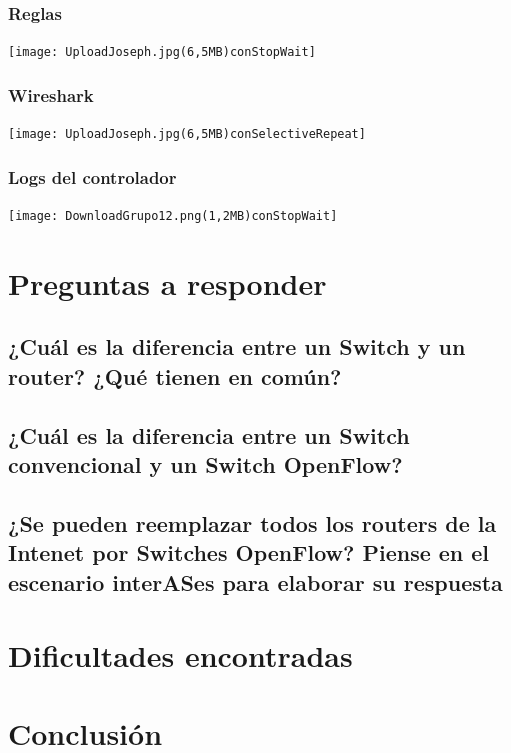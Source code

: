 \documentclass{article}
\begin{document}
\subsubsection{Reglas}
\begin{center}
\texttt{[image: UploadJoseph.jpg(6,5MB)conStopWait]}
\end{center}

\subsubsection{Wireshark}
\begin{center}
\texttt{[image: UploadJoseph.jpg(6,5MB)conSelectiveRepeat]}
\end{center}

\subsubsection{Logs del controlador}
\begin{center}
\texttt{[image: DownloadGrupo12.png(1,2MB)conStopWait]}
\end{center}


\section{\texorpdfstring{\textbf{Preguntas a responder}}{Preguntas a responder}}\label{preguntas-a-responder}

\subsection{\texorpdfstring{\textbf{¿Cuál es la diferencia entre un Switch y un router? ¿Qué tienen en común?}}{1. ¿Cuál es la diferencia entre un Switch y un router? ¿Qué tienen en común?}}\label{describa-la-arquitectura-cliente-servidor.}


\subsection{\texorpdfstring{\textbf{¿Cuál es la diferencia entre un Switch convencional y un Switch OpenFlow?}}{¿Cuál es la diferencia entre un Switch convencional y un Switch OpenFlow?}}\label{detalle-el-protocolo-de-aplicaciuxf3n-desarrollado-en-este-trabajo.}


\subsection{\texorpdfstring{\textbf{¿Se pueden reemplazar todos los routers de la Intenet por Switches OpenFlow? Piense en el escenario interASes para elaborar su respuesta}}{¿Se pueden reemplazar todos los routers de la Intenet por Switches OpenFlow? Piense en el escenario interASes para elaborar su respuesta}}\label{la-capa-de-transporte-del-stack-tcpip-ofrece-dos-protocolos-tcp-y-udp.-quuxe9-servicios-proveen-dichos-protocolos-cuuxe1les-son-sus-caracteruxedsticas-cuuxe1ndo-es-apropiado-utilizar-cada-uno}


\section{\texorpdfstring{\textbf{Dificultades
encontradas}}{Dificultades encontradas}}\label{dificultades-encontradas}

\section{\texorpdfstring{\textbf{Conclusión}}{Conclusión}}\label{conclusiuxf3n-wip}
\end{document}
